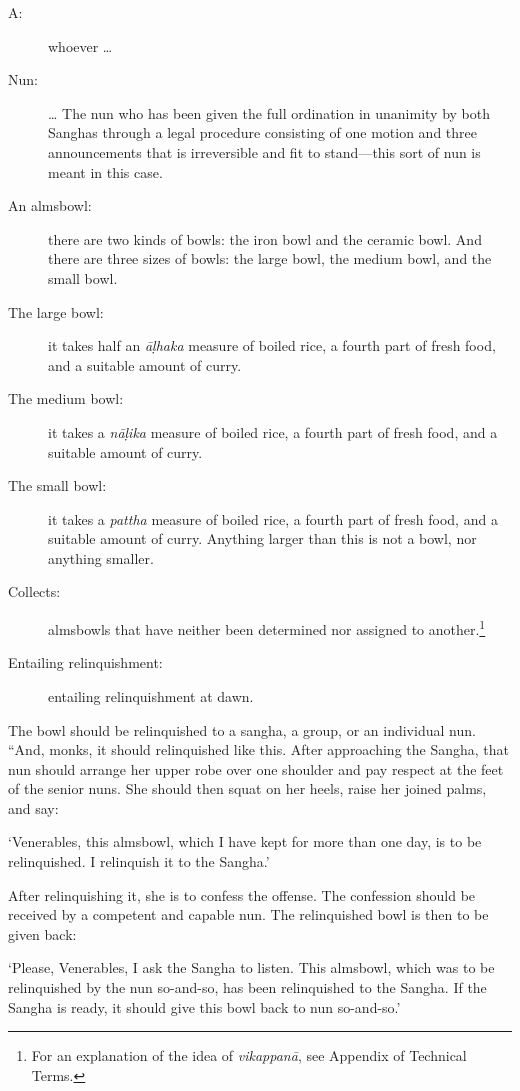 \documentclass[12pt,openany]{book}%
\begin{document}
\begin{description}%
\item[A: ] whoever … %
\item[Nun: ] … The nun who has been given the full ordination in unanimity by both Sanghas through a legal procedure consisting of one motion and three announcements that is irreversible and fit to stand—this sort of nun is meant in this case. %
\item[An almsbowl: ] there are two kinds of bowls: the iron bowl and the ceramic bowl. And there are three sizes of bowls: the large bowl, the medium bowl, and the small bowl. %
\item[The large bowl: ] it takes half an \textit{\textsanskrit{āḷhaka}} measure of boiled rice, a fourth part of fresh food, and a suitable amount of curry. %
\item[The medium bowl: ] it takes a \textit{\textsanskrit{nāḷika}} measure of boiled rice, a fourth part of fresh food, and a suitable amount of curry. %
\item[The small bowl: ] it takes a \textit{pattha} measure of boiled rice, a fourth part of fresh food, and a suitable amount of curry. Anything larger than this is not a bowl, nor anything smaller. %
\item[Collects: ] almsbowls that have neither been determined nor assigned to another.\footnote{For an explanation of the idea of \textit{\textsanskrit{vikappanā}}, see Appendix of Technical Terms. } %
\item[Entailing relinquishment: ] entailing relinquishment at dawn. %
\end{description}

The bowl should be relinquished to a sangha, a group, or an individual nun. “And, monks, it should relinquished like this. After approaching the Sangha, that nun should arrange her upper robe over one shoulder and pay respect at the feet of the senior nuns. She should then squat on her heels, raise her joined palms, and say: 

‘Venerables, this almsbowl, which I have kept for more than one day, is to be relinquished. I relinquish it to the Sangha.’ 

After relinquishing it, she is to confess the offense. The confession should be received by a competent and capable nun. The relinquished bowl is then to be given back: 

‘Please, Venerables, I ask the Sangha to listen. This almsbowl, which was to be relinquished by the nun so-and-so, has been relinquished to the Sangha. If the Sangha is ready, it should give this bowl back to nun so-and-so.’ 
\end{document}
